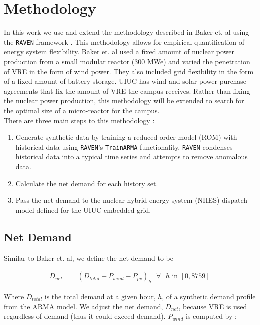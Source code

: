\section{Methodology}

In this work we use and extend the methodology described in Baker et. al using the \texttt{RAVEN} framework \cite{baker_optimal_2018,alfonsi_raven_2016}. This methodology allows for empirical quantification of energy system flexibility. Baker et. al used a fixed amount of nuclear power production from a small modular reactor (300 MWe) and varied the penetration of VRE in the form of wind power. They also included grid flexibility in the form of a fixed amount of battery storage. UIUC has wind and solar power purchase agreements that fix the amount of VRE the campus receives. Rather than fixing the nuclear power production, this methodology will be extended to search for the optimal size of a micro-reactor for the campus. \\
There are three main steps to this methodology \cite{baker_optimal_2018}: 

\begin{enumerate}
	\item Generate synthetic data by training a reduced order model (ROM) with historical data using \texttt{RAVEN}'s \texttt{TrainARMA} functionality. \texttt{RAVEN} condenses historical data into a typical time series and attempts to remove anomalous data.
	\item Calculate the net demand for each history set.
	\item Pass the net demand to the nuclear hybrid energy system (NHES) dispatch model defined for the UIUC embedded grid. 
\end{enumerate}

\subsection{Net Demand}
Similar to Baker et. al, we define the net demand to be 


\begin{equation}
	\label{eqn:net-demand}
	\begin{split}
		D_{net} & = (D_{total} - P_{wind} - P_{pv})_h \text{ $\forall$ $h$ in } [0,8759]
	\end{split}
\end{equation}

Where $D_{total}$ is the total demand at a given hour, $h$, of a synthetic demand profile from the ARMA model. We adjust the net demand, $D_{net}$, because VRE is used regardless of demand (thus it could exceed demand). $P_{wind}$ is computed by \cite{garcia_nuclear_2015}:


